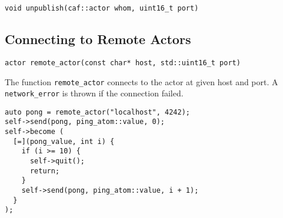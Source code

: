 \begin{lstlisting}
void unpublish(caf::actor whom, uint16_t port)
\end{lstlisting}

\clearpage
\subsection{Connecting to Remote Actors}

\begin{lstlisting}
actor remote_actor(const char* host, std::uint16_t port)
\end{lstlisting}

The function \lstinline^remote_actor^ connects to the actor at given host and port.
A \lstinline^network_error^ is thrown if the connection failed.

\begin{lstlisting}
auto pong = remote_actor("localhost", 4242);
self->send(pong, ping_atom::value, 0);
self->become (
  [=](pong_value, int i) {
    if (i >= 10) {
      self->quit();
      return;
    }
    self->send(pong, ping_atom::value, i + 1);
  }
);
\end{lstlisting}
